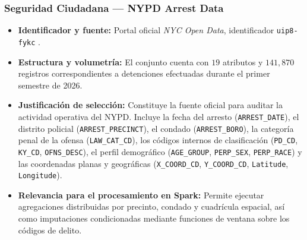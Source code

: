 \subsubsection{Seguridad Ciudadana --- NYPD Arrest Data}
\begin{itemize}
    \item \textbf{Identificador y fuente:} Portal oficial \textit{NYC Open Data}, identificador \texttt{uip8-fykc} \cite{nypd_arrests_ytd_2026}.
    \item \textbf{Estructura y volumetría:} El conjunto cuenta con $19$ atributos y $141,870$ registros correspondientes a detenciones efectuadas durante el primer semestre de 2026.
    \item \textbf{Justificación de selección:} Constituye la fuente oficial para auditar la actividad operativa del NYPD. Incluye la fecha del arresto (\texttt{ARREST\_DATE}), el distrito policial (\texttt{ARREST\_PRECINCT}), el condado (\texttt{ARREST\_BORO}), la categoría penal de la ofensa (\texttt{LAW\_CAT\_CD}), los códigos internos de clasificación (\texttt{PD\_CD}, \texttt{KY\_CD}, \texttt{OFNS\_DESC}), el perfil demográfico (\texttt{AGE\_GROUP}, \texttt{PERP\_SEX}, \texttt{PERP\_RACE}) y las coordenadas planas y geográficas (\texttt{X\_COORD\_CD}, \texttt{Y\_COORD\_CD}, \texttt{Latitude}, \texttt{Longitude}).
    \item \textbf{Relevancia para el procesamiento en Spark:} Permite ejecutar agregaciones distribuidas por precinto, condado y cuadrícula espacial, así como imputaciones condicionadas mediante funciones de ventana sobre los códigos de delito.
\end{itemize}

